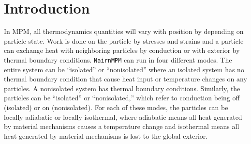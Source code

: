 \documentclass[11pt]{book}
\begin{document}
\section{Introduction}

In MPM, all thermodynamics quantities will vary with position by depending on particle state. Work is done on the particle by stresses and strains and a particle can exchange heat with neighboring particles by conduction or with exterior by thermal boundary conditions. {\tt NairnMPM} can run in four different modes. The entire system can be ``isolated'' or ``nonisolated'' where an isolated system has no thermal boundary condition that cause heat input or temperature changes on any particles. A nonisolated system has thermal boundary conditions. Similarly, the particles can be ``isolated'' or ``nonisolated,'' which refer to conduction being off (isolated) or on (nonisolated). For each of these modes, the particles can be locally adiabatic or locally isothermal, where adiabatic means all heat generated by material mechanisms causes a temperature change and isothermal means all heat generated by material mechanisms is lost to the global exterior.
\end{document}
